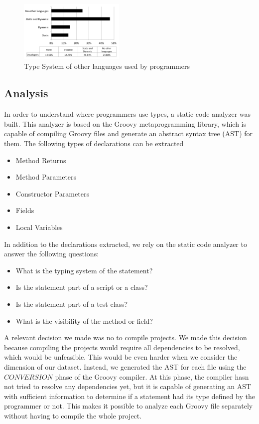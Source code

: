 \documentclass[preprint]{sigplanconf}
\begin{document}
\begin{figure}[ht]
\centering \includegraphics[width=0.45\textwidth]{typeSystem_background}
\caption{Type System of other languages used by programmers}
\label{fig:typeSystem_background} 
\end{figure}



\subsection{Analysis\label{analyzer}}
In order to understand where programmers use types, a static code analyzer was built. 
This analyzer is based on the Groovy metaprogramming library, which is capable of compiling Groovy files and generate an abstract syntax tree (AST) for them.
The following types of declarations can be extracted

\begin{itemize}
	\item Method Returns
	\item Method Parameters
	\item Constructor Parameters
	\item Fields
	\item Local Variables
\end{itemize}

In addition to the declarations extracted, we rely on the static code analyzer to answer the following questions:

\begin{itemize}
	\item What is the typing system of the statement?
	\item Is the statement part of a script or a class?
	\item Is the statement part of a test class?
	\item What is the visibility of the method or field?
\end{itemize}


A relevant decision we made was no to compile projects.
We made this decision because compiling the projects would require all dependencies to be resolved, which would be unfeasible.
This would be even harder when we consider the dimension of our dataset.
Instead, we generated the AST for each file using the $CONVERSION$ phase of the Groovy compiler.
At this phase, the compiler hasn not tried to resolve any dependencies yet, but it is capable of generating an AST with sufficient information to determine if a statement had its type defined by the programmer or not.
This makes it possible to analyze each Groovy file separately without having to compile the whole project.
\end{document}
